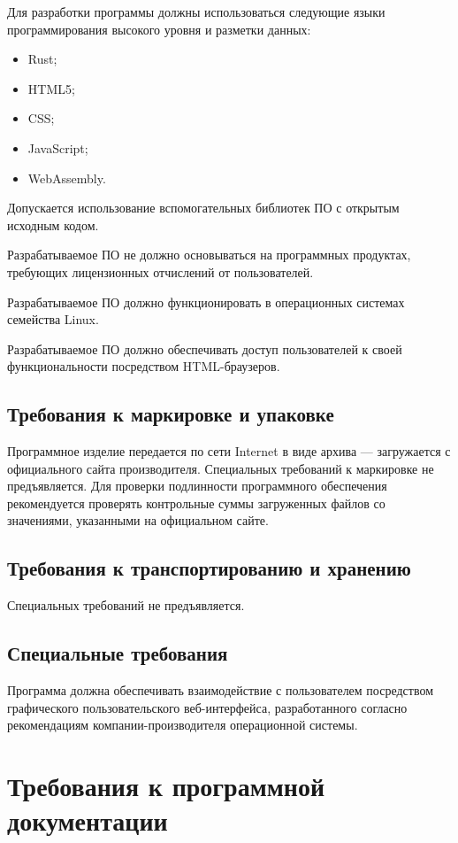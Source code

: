 \documentclass[a4page]{article}
\begin{document}
Для разработки программы должны использоваться следующие языки программирования высокого уровня и разметки данных:

\begin{itemize}
  \item Rust;
  \item HTML5;
  \item CSS;
  \item JavaScript;
  \item WebAssembly.
\end{itemize}

Допускается использование вспомогательных библиотек ПО с открытым исходным кодом.

Разрабатываемое ПО не должно основываться на программных продуктах, требующих лицензионных отчислений от пользователей.

Разрабатываемое ПО должно функционировать в операционных системах семейства Linux.

Разрабатываемое ПО должно обеспечивать доступ пользователей к своей функциональности посредством HTML-браузеров.

\subsection{Требования к маркировке и упаковке}

Программное изделие передается по сети Internet в виде архива — загружается с официального сайта производителя. Специальных требований к маркировке не предъявляется. Для проверки подлинности программного обеспечения рекомендуется проверять контрольные суммы загруженных файлов со значениями, указанными на официальном сайте.

\subsection{Требования к транспортированию и хранению}

Специальных требований не предъявляется.

\subsection{Специальные требования}

Программа должна обеспечивать взаимодействие с пользователем посредством графического пользовательского веб-интерфейса, разработанного согласно рекомендациям компании-производителя операционной системы.

\section{Требования к программной документации}
\end{document}
